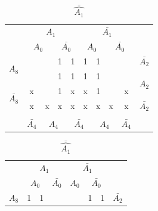 \documentclass[a4paper,14pt]{article}
\begin{document}
\begin{table}[!htb]
	\begin{minipage}{.5\linewidth}
		\caption{$\hat{A_1}$}
		\centering
		\begin{tabular}{cccccccccc}
			& \multicolumn{4}{c}{$A_1$} & \multicolumn{4}{c}{$\bar{A_1}$} &  \\
			& \multicolumn{2}{c}{$A_0$} & \multicolumn{2}{c}{$\bar{A_0}$} & \multicolumn{2}{c}{$A_0$} & \multicolumn{2}{c}{$\bar{A_0}$} &  \\ \cline{2-9}
			\multicolumn{1}{c|}{\multirow{2}{*}{$A_8$}} & \multicolumn{1}{c|}{} & \multicolumn{1}{c|}{} & \multicolumn{1}{c|}{1} & \multicolumn{1}{c|}{1} & \multicolumn{1}{c|}{1} & \multicolumn{1}{c|}{1} & \multicolumn{1}{c|}{} & \multicolumn{1}{c|}{} & $\bar{A_2}$ \\ \cline{2-9}
			\multicolumn{1}{c|}{} & \multicolumn{1}{c|}{} & \multicolumn{1}{c|}{} & \multicolumn{1}{c|}{1} & \multicolumn{1}{c|}{1} & \multicolumn{1}{c|}{1} & \multicolumn{1}{c|}{1} & \multicolumn{1}{c|}{} & \multicolumn{1}{c|}{} & \multirow{2}{*}{$A_2$} \\ \cline{2-9}
			\multicolumn{1}{c|}{\multirow{2}{*}{$\bar{A_8}$}} & \multicolumn{1}{c|}{x} & \multicolumn{1}{c|}{} & \multicolumn{1}{c|}{1} & \multicolumn{1}{c|}{x} & \multicolumn{1}{c|}{x} & \multicolumn{1}{c|}{1} & \multicolumn{1}{c|}{} & \multicolumn{1}{c|}{x} &  \\ \cline{2-9}
			\multicolumn{1}{c|}{} & \multicolumn{1}{c|}{x} & \multicolumn{1}{c|}{x} & \multicolumn{1}{c|}{x} & \multicolumn{1}{c|}{x} & \multicolumn{1}{c|}{x} & \multicolumn{1}{c|}{x} & \multicolumn{1}{c|}{x} & \multicolumn{1}{c|}{x} & $\bar{A_2}$ \\ \cline{2-9}
			\\
			& $\bar{A_4}$ & \multicolumn{2}{c}{$A_4$} & \multicolumn{2}{c}{$\bar{A_4}$} & \multicolumn{2}{c}{$A_4$} & $\bar{A_4}$ & 
		\end{tabular}
	\end{minipage}%
	\begin{minipage}{.5\linewidth}
		\centering
		\caption{$\bar{\hat{A_1}}$}
		\begin{tabular}{cccccccccc}
			& \multicolumn{4}{c}{$A_1$} & \multicolumn{4}{c}{$\bar{A_1}$} &  \\
			& \multicolumn{2}{c}{$A_0$} & \multicolumn{2}{c}{$\bar{A_0}$} & \multicolumn{2}{c}{$A_0$} & \multicolumn{2}{c}{$\bar{A_0}$} &  \\ \cline{2-9}
			\multicolumn{1}{c|}{\multirow{2}{*}{$A_8$}} & \multicolumn{1}{c|}{1} & \multicolumn{1}{c|}{1} & \multicolumn{1}{c|}{} & \multicolumn{1}{c|}{} & \multicolumn{1}{c|}{} & \multicolumn{1}{c|}{} & \multicolumn{1}{c|}{1} & \multicolumn{1}{c|}{1} & $\bar{A_2}$ \\ \cline{2-9}

\end{tabular}
\end{minipage}
\end{table}
\end{document}
